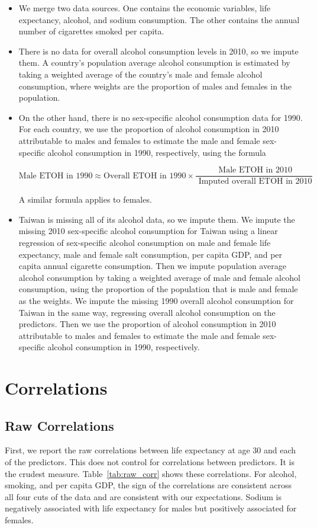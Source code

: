 \documentclass[11pt]{article}\usepackage[]{graphicx}\usepackage[]{color}
\begin{document}
\begin{itemize}
\item We merge two data sources. One contains the economic variables, life expectancy, alcohol, and sodium consumption. The other contains the annual number of cigarettes smoked per capita.
\item There is no data for overall alcohol consumption levels in 2010, so we impute them. 
A country's population average alcohol consumption is estimated by taking a weighted average of the country's male and female alcohol consumption, where weights are the proportion of males and females in the population.  
\item On the other hand, there is no sex-specific alcohol consumption data for 1990.  
For each country, we use the proportion of alcohol consumption in 2010 attributable to males and females to estimate the male and female sex-specific alcohol consumption in 1990, respectively, using the formula

$$\text{Male ETOH in 1990} \approx \text{Overall ETOH in 1990} \times \frac{\text{ Male ETOH in 2010}}{\text{ Imputed overall ETOH in 2010}}$$

\noindent A similar formula applies to females.
\item Taiwan is missing all of its alcohol data, so we impute them.
We impute the missing 2010 sex-specific alcohol consumption for Taiwan using a linear regression of sex-specific alcohol consumption on male and female life expectancy, male and female salt consumption, per capita GDP, and per capita annual cigarette consumption. 
Then we impute population average alcohol consumption by taking a weighted average of male and female alcohol consumption, using the proportion of the population that is male and female as the weights. 
We impute the missing 1990 overall alcohol consumption for Taiwan in the same way, regressing overall alcohol consumption on the predictors. 
Then we use the proportion of alcohol consumption in 2010 attributable to males and females to estimate the male and female sex-specific alcohol consumption in 1990, respectively.
\end{itemize}






\section{Correlations}
\subsection{Raw Correlations}
First, we report the raw correlations between life expectancy at age 30 and each of the predictors.
This does not control for correlations between predictors.
It is the crudest measure.
Table~\ref{tab:raw_corr} shows these correlations.
For alcohol, smoking, and per capita GDP, the sign of the correlations are consistent across all four cuts of the data and are consistent with our expectations.
Sodium is negatively associated with life expectancy for males but positively associated for females.
\end{document}
